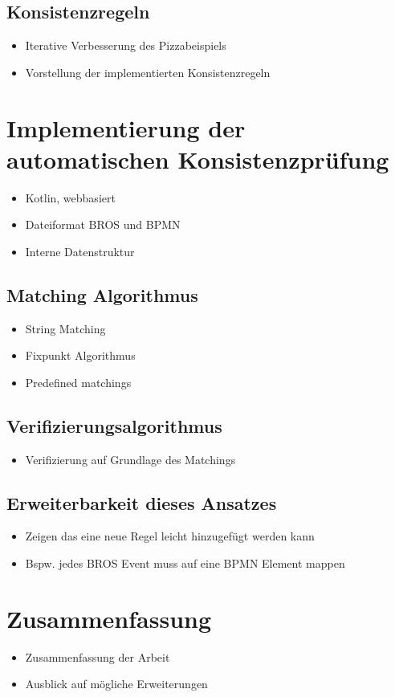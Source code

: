 \documentclass[ngerman]{tudscrreprt}
\begin{document}
\section{Konsistenzregeln}

\begin{itemize}
  \item Iterative Verbesserung des Pizzabeispiels
  \item Vorstellung der implementierten Konsistenzregeln
\end{itemize}

\chapter{Implementierung der automatischen Konsistenzprüfung}

\begin{itemize}
  \item Kotlin, webbasiert
  \item Dateiformat BROS und BPMN
  \item Interne Datenstruktur
\end{itemize}

\section{Matching Algorithmus}

\begin{itemize}
  \item String Matching
  \item Fixpunkt Algorithmus
  \item Predefined matchings
\end{itemize}

\section{Verifizierungsalgorithmus}

\begin{itemize}
  \item Verifizierung auf Grundlage des Matchings
\end{itemize}

\section{Erweiterbarkeit dieses Ansatzes}

\begin{itemize}
  \item Zeigen das eine neue Regel leicht hinzugefügt werden kann
  \item Bspw. jedes BROS Event muss auf eine BPMN Element mappen
\end{itemize}

\chapter{Zusammenfassung}

\begin{itemize}
  \item Zusammenfassung der Arbeit
  \item Ausblick auf mögliche Erweiterungen
\end{itemize}

\printbibliography
\end{document}
